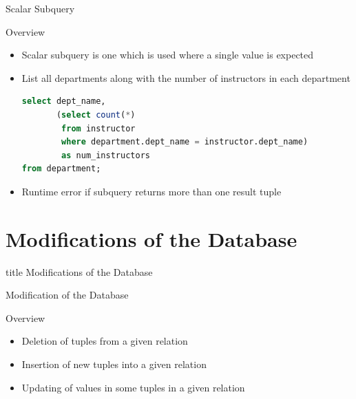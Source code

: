 \documentclass[aspectratio=169, xcolor=dvipsnames]{beamer}
\begin{document}
\begin{frame}[fragile]{Scalar Subquery}
    \begin{block}{Overview}
        \begin{itemize}[<+->]
            \item Scalar subquery is one which is used where a single value is expected
            \item List all departments along with the number of instructors in each department
            \begin{lstlisting}[language=SQL]
select dept_name, 
       (select count(*) 
        from instructor 
        where department.dept_name = instructor.dept_name) 
        as num_instructors 
from department;
            \end{lstlisting}
            \item Runtime error if subquery returns more than one result tuple
        \end{itemize}
    \end{block}
\end{frame}

\section{Modifications of the Database}

\begin{frame}
  \vfill
  \centering
  \begin{beamercolorbox}[sep=8pt,center,shadow=true,rounded=true]{title}
    Modifications of the Database\par%
  \end{beamercolorbox}
  \vfill
\end{frame}

\begin{frame}{Modification of the Database}
    \begin{block}{Overview}
        \begin{itemize}[<+->]
            \item Deletion of tuples from a given relation
            \item Insertion of new tuples into a given relation
            \item Updating of values in some tuples in a given relation
        \end{itemize}
    \end{block}
\end{frame}
\end{document}
